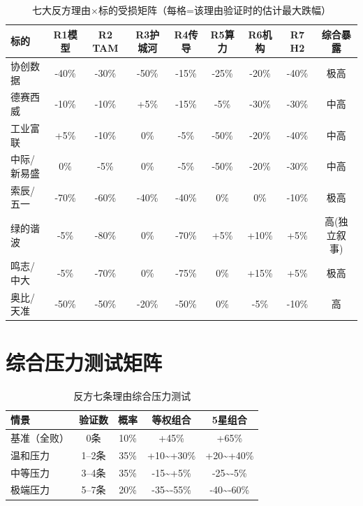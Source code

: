 \begin{table}[H]
\centering\scriptsize
\renewcommand{\arraystretch}{1.1}
\begin{tabularx}{\textwidth}{l c c c c c c c c}
\toprule
\textbf{标的} & \textbf{R1模型} & \textbf{R2 TAM} & \textbf{R3护城河} & \textbf{R4传导} & \textbf{R5算力} & \textbf{R6机构} & \textbf{R7 H2} & \textbf{综合暴露} \\
\midrule
协创数据 & -40\% & -30\% & \textcolor{riskred}{-50\%} & -15\% & -25\% & -20\% & -40\% & \textcolor{riskred}{极高} \\
德赛西威 & -10\% & -10\% & +5\% & -15\% & -5\% & \textcolor{riskred}{-30\%} & -30\% & 中高 \\
工业富联 & +5\% & -10\% & 0\% & -5\% & \textcolor{riskred}{-50\%} & -20\% & -40\% & 中高 \\
中际/新易盛 & 0\% & -5\% & 0\% & -5\% & \textcolor{riskred}{-50\%} & -20\% & -30\% & 中高 \\
索辰/五一 & \textcolor{riskred}{-70\%} & -60\% & -40\% & -40\% & 0\% & 0\% & -10\% & \textcolor{riskred}{极高} \\
绿的谐波 & -5\% & \textcolor{riskred}{-80\%} & 0\% & \textcolor{riskred}{-70\%} & +5\% & +10\% & +5\% & 高(独立叙事) \\
鸣志/中大 & -5\% & -70\% & 0\% & \textcolor{riskred}{-75\%} & 0\% & +15\% & +5\% & \textcolor{riskred}{极高} \\
奥比/天准 & -50\% & -50\% & -20\% & -50\% & 0\% & -5\% & -10\% & 高 \\
\bottomrule
\end{tabularx}
\caption{七大反方理由$\times$标的受损矩阵（每格=该理由验证时的估计最大跌幅）}
\end{table}

\section{综合压力测试矩阵}

\begin{table}[H]
\centering\small
\renewcommand{\arraystretch}{1.2}
\begin{tabularx}{\textwidth}{l c c c c}
\toprule
\textbf{情景} & \textbf{验证数} & \textbf{概率} & \textbf{等权组合} & \textbf{5星组合} \\
\midrule
基准（全败） & 0条 & 10\% & +45\% & +65\% \\
温和压力 & 1--2条 & 35\% & +10\textasciitilde+30\% & +20\textasciitilde+40\% \\
中等压力 & 3--4条 & 35\% & -15\textasciitilde+5\% & -25\textasciitilde-5\% \\
\textcolor{riskred}{极端压力} & 5--7条 & 20\% & -35\textasciitilde-55\% & -40\textasciitilde-60\% \\
\bottomrule
\end{tabularx}
\caption{反方七条理由综合压力测试}
\end{table}

